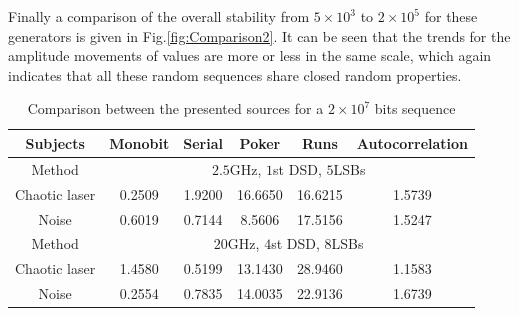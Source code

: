 Finally a comparison of the overall stability from $5\times10^3$ to
$2\times10^5$ for these generators is given in
Fig.\ref{fig:Comparison2}. It can be seen that the trends for the
amplitude movements of values are more or less in the same scale,
which again indicates that all these random sequences share closed
random properties.
%
\begin{table}[!t]
  \centering
  \renewcommand{\arraystretch}{1.3}
  \caption{Comparison between the presented sources for a $2 \times 10^7$ bits sequence}
  \label{Comparison}
  \centering
  \begin{tabular}{|c|c|c|c|c|c|}
    \hline
    \textbf{Subjects} & Monobit & Serial & Poker & Runs & Autocorrelation  \\ \hline
    Method& \multicolumn{5}{c|}{ $2.5$GHz, $1$st DSD, $5$LSBs}\\ \hline
    Chaotic laser  		&0.2509	&1.9200	&16.6650&16.6215&1.5739\\ 
    Noise 	&0.6019	&0.7144	&8.5606&17.5156&1.5247\\ \hline
    Method &\multicolumn{5}{c|}{ $20$GHz, $4$st DSD, $8$LSBs}\\ \hline
    Chaotic laser  		&1.4580	&0.5199	&13.1430 &28.9460 &1.1583\\
    Noise 	&0.2554	&0.7835	&14.0035&22.9136&1.6739\\ \hline
    
    \hline
  \end{tabular}
\end{table}

